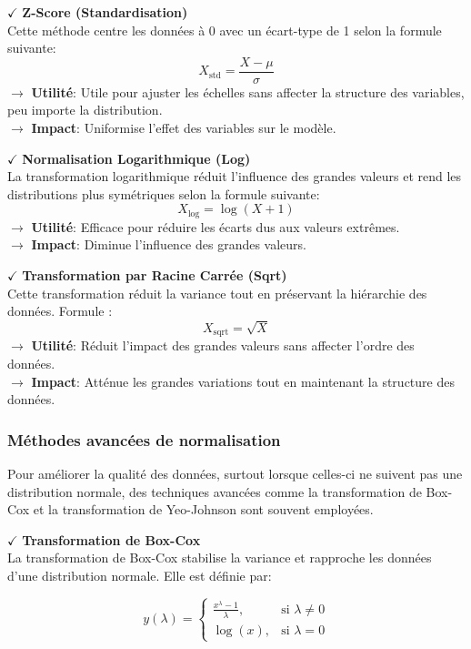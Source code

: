 \textbf{\(\checkmark\)} \textbf{Z-Score (Standardisation)} \\
    Cette méthode centre les données à 0 avec un écart-type de 1 selon la formule suivante:
    \[
    X_{\text{std}} = \frac{X - \mu}{\sigma}
    \]
\textbf{\(\rightarrow\)} \textbf{Utilité}: Utile pour ajuster les échelles sans affecter la structure des variables, peu importe la distribution.\\
\textbf{\(\rightarrow\)} \textbf{Impact}: Uniformise l'effet des variables sur le modèle.

\textbf{\(\checkmark\)} \textbf{Normalisation Logarithmique (Log)} \\
    La transformation logarithmique réduit l'influence des grandes valeurs et rend les distributions plus symétriques selon la formule suivante: 
    \[
    X_{\text{log}} = \log(X + 1)
    \]
\textbf{\(\rightarrow\)} \textbf{Utilité}: Efficace pour réduire les écarts dus aux valeurs extrêmes.\\
\textbf{\(\rightarrow\)} \textbf{Impact}: Diminue l'influence des grandes valeurs.

\textbf{\(\checkmark\)} \textbf{Transformation par Racine Carrée (Sqrt)} \\
    Cette transformation réduit la variance tout en préservant la hiérarchie des données. Formule :
    \[
    X_{\text{sqrt}} = \sqrt{X}
    \]
\textbf{\(\rightarrow\)} \textbf{Utilité}: Réduit l'impact des grandes valeurs sans affecter l'ordre des données.\\
\textbf{\(\rightarrow\)} \textbf{Impact}: Atténue les grandes variations tout en maintenant la structure des données.

\subsubsection{Méthodes avancées de normalisation}

Pour améliorer la qualité des données, surtout lorsque celles-ci ne suivent pas une distribution normale, des techniques avancées comme la transformation de Box-Cox et la transformation de Yeo-Johnson sont souvent employées.

\textbf{\(\checkmark\)} \textbf{Transformation de Box-Cox} \\
La transformation de Box-Cox \cite{titleB1000} stabilise la variance et rapproche les données d'une distribution normale. Elle est définie par:

\[
y(\lambda) =
\begin{cases} 
\frac{x^\lambda - 1}{\lambda}, & \text{si } \lambda \neq 0 \\
\log(x), & \text{si } \lambda = 0
\end{cases}
\]

